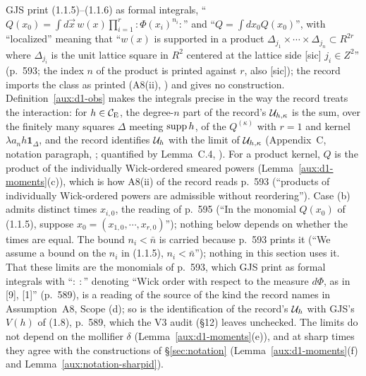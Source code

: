 \begin{auxrem}\label{aux:d1-def}
GJS print (1.1.5)--(1.1.6) as formal integrals, ``$Q(x_0)=\int d\vec x\,w(x)\prod_{i=1}^r
{:}\Phi(x_i)^{n_i}{:}$'' and ``$Q=\int dx_0Q(x_0)$'', with ``localized'' meaning that ``$w(x)$
is supported in a product $\Delta_{j_1}\times\cdots\times\Delta_{j_n}\subset R^{2r}$ where
$\Delta_{j_i}$ is the unit lattice square in $R^2$ centered at the lattice side [sic]
$j_i\in Z^2$'' (p.~593; the index $n$ of the product is printed against $r$, also [sic]); the
record imports the class as printed (A8(ii), \cite[p.~10]{R}) and gives no construction.
Definition~\ref{aux:d1-obs} makes the integrals precise in the way the record treats the
interaction: for $h\in\mathcal{C}_{\mathrm E}$, the degree-$n$ part of the record's $\mathcal U_{h,\kappa}$ is the sum,
over the finitely many squares $\Delta$ meeting $\operatorname{supp} h$, of the $Q^{(\kappa)}$ with $r=1$ and
kernel $\lambda a_nh\mathbf 1_\Delta$, and the record identifies $\mathcal U_h$ with the limit of
$\mathcal U_{h,\kappa}$ (Appendix~C, notation paragraph, \cite[p.~39]{R}; quantified by
Lemma~C.4, \cite[p.~40]{R}). For a product kernel, $Q$ is the product of the individually
Wick-ordered smeared powers (Lemma~\ref{aux:d1-moments}(c)), which is how A8(ii) of the record
reads p.~593 (``products of individually Wick-ordered powers are admissible without
reordering''). Case (b) admits distinct times $x_{i,0}$, the reading of p.~595 (``In the
monomial $Q(x_0)$ of (1.1.5), suppose $x_0=(x_{1,0},\cdots,x_{r,0})$''); nothing below
depends on whether the times are equal. The bound $n_i<\bar n$ is carried because p.~593
prints it (``We assume a bound on the $n_i$ in (1.1.5), $n_i<\bar n$''); nothing in this
section uses it.  That these limits are the monomials of p.~593, which GJS print as formal
integrals with ``${:}\ {:}$'' denoting ``Wick order with respect to the measure $d\Phi$, as in
[9], [1]'' (p.~589), is a reading of the source of the kind the record names in
Assumption~A8, Scope (d); so is the identification of the record's $\mathcal U_h$ with GJS's
$V(h)$ of (1.8), p.~589, which the V3 audit (\S12) leaves unchecked.  The limits do not depend on
the mollifier $\delta$ (Lemma~\ref{aux:d1-moments}(e)), and at sharp times they agree with the
constructions of \S\ref{sec:notation} (Lemma~\ref{aux:d1-moments}(f) and
Lemma~\ref{aux:notation-sharpid}).
\end{auxrem}

